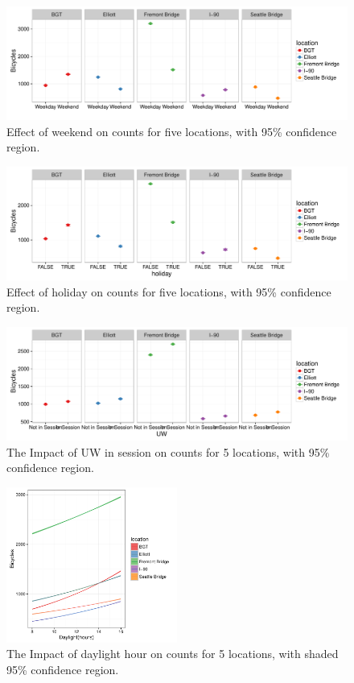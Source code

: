 \documentclass [11pt, proquest] {uwthesis}[2015/03/03]
\begin{document}
\begin{figure}
  \includegraphics[width=1\textwidth]{figures/5sites/Sim_wknd} 
 \caption{Effect of weekend on counts for five locations, with 95\% confidence region. }
 \label{fig:Sim_wknd}
\end{figure}

\begin{figure}
  \includegraphics[width=1\textwidth]{figures/5sites/Sim_ho} 
 \caption{Effect of holiday on counts for five locations, with 95\% confidence region.}
 \label{fig:Sim_holiday}
\end{figure}


\begin{figure}
  \includegraphics[width=1\textwidth]{figures/5sites/Sim_UW} 
 \caption{The Impact of UW in session on counts for 5 locations, with 95\% confidence region. }
 \label{fig:Sim_UW}
\end{figure}

\begin{figure}
  \centering
  \includegraphics[width=0.5\textwidth]{figures/5sites/Sim_daylight} 
 \caption{The Impact of daylight hour on counts for 5 locations, with shaded 95\% confidence region.}
 \label{fig:Sim_daylight}
\end{figure}
\end{document}
